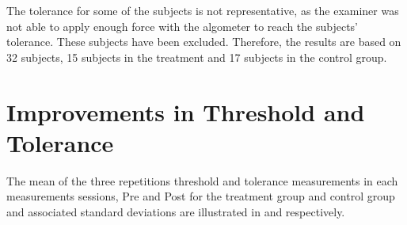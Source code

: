 The tolerance for some of the subjects is not representative, as the examiner was not able to apply enough force with the algometer to reach the subjects' tolerance. 
These subjects have been excluded. Therefore, the results are based on 32 subjects, 15 subjects in the treatment and 17 subjects in the control group.

\section{Improvements in Threshold and Tolerance}
The mean of the three repetitions threshold and tolerance measurements in each measurements sessions, Pre and Post for the treatment group and control group and associated standard deviations are illustrated in  and  respectively. 


